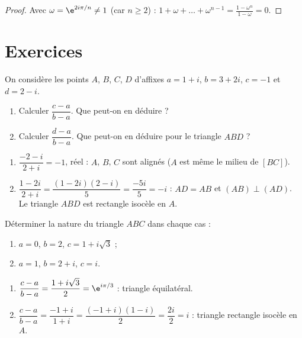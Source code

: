 \begin{proof}
Avec $\omega=\e^{2i\pi/n}\neq1$ (car $n\ge2$) : $1+\omega+\dots+\omega^{n-1}=\frac{1-\omega^n}{1-\omega}=0$.
\end{proof}
\begin{figurebox}
\end{figurebox}

\mxnewpage
\section{Exercices}
\begin{exercise}
On considère les points $A$, $B$, $C$, $D$ d'affixes $a=1+i$, $b=3+2i$, $c=-1$ et $d=2-i$.
\begin{enumerate}
\item Calculer $\dfrac{c-a}{b-a}$. Que peut-on en déduire ?
\item Calculer $\dfrac{d-a}{b-a}$. Que peut-on en déduire pour le triangle $ABD$ ?
\end{enumerate}
\end{exercise}
\begin{solution}
\begin{enumerate}
\item $\dfrac{-2-i}{2+i}=-1$, réel : $A$, $B$, $C$ sont alignés ($A$ est même le milieu de $[BC]$).
\item $\dfrac{1-2i}{2+i}=\dfrac{(1-2i)(2-i)}5=\dfrac{-5i}5=-i$ : $AD=AB$ et $(AB)\perp(AD)$. Le triangle $ABD$ est rectangle isocèle en $A$.
\end{enumerate}
\end{solution}

\begin{exercise}
Déterminer la nature du triangle $ABC$ dans chaque cas :
\begin{enumerate}
\item $a=0$, $b=2$, $c=1+i\sqrt3$ ;
\item $a=1$, $b=2+i$, $c=i$.
\end{enumerate}
\end{exercise}
\begin{solution}
\begin{enumerate}
\item $\dfrac{c-a}{b-a}=\dfrac{1+i\sqrt3}2=\e^{i\pi/3}$ : triangle équilatéral.
\item $\dfrac{c-a}{b-a}=\dfrac{-1+i}{1+i}=\dfrac{(-1+i)(1-i)}2=\dfrac{2i}{2}=i$ : triangle rectangle isocèle en $A$.
\end{enumerate}
\end{solution}

